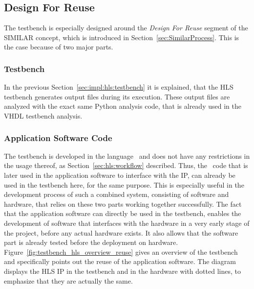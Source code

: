\subsection{Design For Reuse}

The testbench is especially designed around the \textit{Design For Reuse} segment of the SIMILAR concept, which is introduced in Section~\ref{sec:SimilarProcess}.
This is the case because of two major parts.

\subsubsection{Testbench}

In the previous Section~\ref{sec:impl:hls:testbench} it is explained, that the HLS testbench generates output files during its execution.
These output files are analyzed with the exact same Python analysis code, that is already used in the VHDL testbench analysis.

\subsubsection{Application Software Code}

The testbench is developed in the language \cplusplus\ and does not have any restrictions in the usage thereof, as Section~\ref{sec:hls:workflow} described.
Thus, the \cplusplus\ code that is later used in the application software to interface with the IP, can already be used in the testbench here, for the same purpose.
This is especially useful in the development process of such a combined system, consisting of software and hardware, that relies on these two parts working together successfully.
The fact that the application software can directly be used in the testbench, enables the development of software that interfaces with the hardware in a very early stage of the project, before any actual hardware exists.
It also allows that the software part is already tested before the deployment on hardware.\\

Figure~\ref{fig:testbench_hls_overview_reuse} gives an overview of the testbench and specifically points out the reuse of the application software.
The diagram displays the HLS IP in the testbench and in the hardware with dotted lines, to emphasize that they are actually the same.\\

